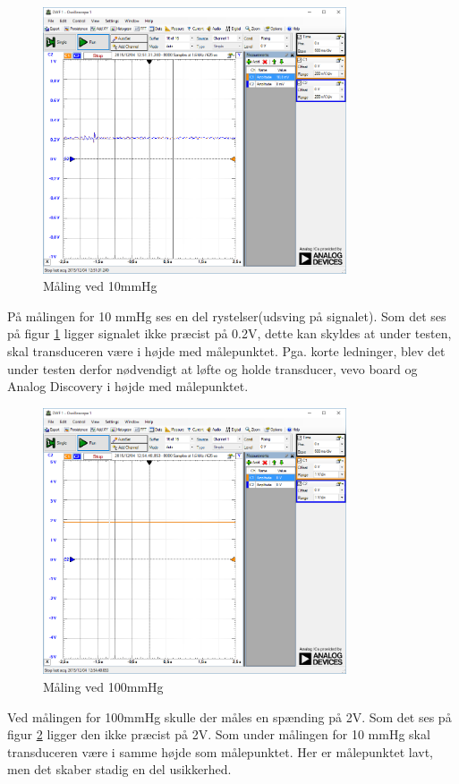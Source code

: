 \begin{figure}[H]
	\centering	\includegraphics[width=0.8\textwidth]{Figurer/10mmhg}
	\caption{Måling ved 10mmHg}
	\label{fig:vandtest_måling10}
\end{figure}
På målingen for 10 mmHg ses en del rystelser(udsving på signalet). Som det ses på figur \ref{fig:vandtest_måling10} ligger signalet ikke præcist på 0.2V, dette kan skyldes at under testen, skal transduceren være i højde med målepunktet. Pga. korte ledninger, blev det under testen derfor nødvendigt at løfte og holde transducer, vevo board og Analog Discovery i højde med målepunktet. 

\begin{figure}[H]
	\centering	\includegraphics[width=0.8\textwidth]{Figurer/100mmhg}
	\caption{Måling ved 100mmHg}
	\label{fig:vandtest_måling100}
\end{figure}
Ved målingen for 100mmHg skulle der måles en spænding på 2V. Som det ses på figur \ref{fig:vandtest_måling100} ligger den ikke præcist på 2V. Som under målingen for 10 mmHg skal transduceren være i samme højde som målepunktet. Her er målepunktet lavt, men det skaber stadig en del usikkerhed.

